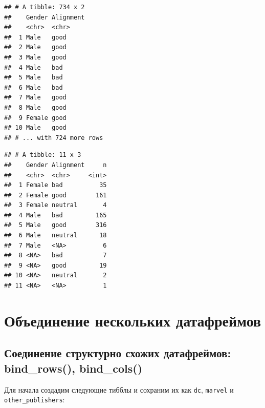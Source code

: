 \documentclass[
]{book}
\newenvironment{Shaded}{\begin{snugshade}}{\end{snugshade}}
\newcommand{\ControlFlowTok}[1]{\textcolor[rgb]{0.13,0.29,0.53}{\textbf{#1}}}
\newcommand{\DataTypeTok}[1]{\textcolor[rgb]{0.13,0.29,0.53}{#1}}
\newcommand{\DecValTok}[1]{\textcolor[rgb]{0.00,0.00,0.81}{#1}}
\newcommand{\KeywordTok}[1]{\textcolor[rgb]{0.13,0.29,0.53}{\textbf{#1}}}
\newcommand{\NormalTok}[1]{#1}
\newcommand{\OperatorTok}[1]{\textcolor[rgb]{0.81,0.36,0.00}{\textbf{#1}}}
\newcommand{\OtherTok}[1]{\textcolor[rgb]{0.56,0.35,0.01}{#1}}
\newcommand{\StringTok}[1]{\textcolor[rgb]{0.31,0.60,0.02}{#1}}
\begin{document}
\begin{verbatim}
## # A tibble: 734 x 2
##    Gender Alignment
##    <chr>  <chr>    
##  1 Male   good     
##  2 Male   good     
##  3 Male   good     
##  4 Male   bad      
##  5 Male   bad      
##  6 Male   bad      
##  7 Male   good     
##  8 Male   good     
##  9 Female good     
## 10 Male   good     
## # ... with 724 more rows
\end{verbatim}

\begin{Shaded}
\end{Shaded}

\begin{verbatim}
## # A tibble: 11 x 3
##    Gender Alignment     n
##    <chr>  <chr>     <int>
##  1 Female bad          35
##  2 Female good        161
##  3 Female neutral       4
##  4 Male   bad         165
##  5 Male   good        316
##  6 Male   neutral      18
##  7 Male   <NA>          6
##  8 <NA>   bad           7
##  9 <NA>   good         19
## 10 <NA>   neutral       2
## 11 <NA>   <NA>          1
\end{verbatim}

\hypertarget{tidy_several}{%
\section{Объединение нескольких датафреймов}\label{tidy_several}}

\hypertarget{tidy_bind}{%
\subsection{Соединение структурно схожих датафреймов: bind\_rows(), bind\_cols()}\label{tidy_bind}}

Для начала создадим следующие тибблы и сохраним их как \texttt{dc}, \texttt{marvel} и \texttt{other\_publishers}:

\begin{Shaded}
\end{Shaded}
\end{document}
